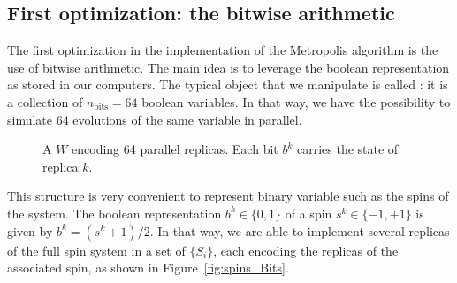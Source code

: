 \subsection{First optimization: the bitwise arithmetic}
The first optimization in the implementation of the Metropolis algorithm is the use of bitwise arithmetic. The main idea is to leverage the boolean representation as stored in our computers. The typical object that we manipulate is called \Bits: it is a collection of $n_\text{bits}=64$ boolean variables. In that way, we have the possibility to simulate $64$ evolutions of the same variable in parallel.
\begin{figure}[ht]
\centering
{}
\caption{A \Bits $W$ encoding 64 parallel replicas. Each bit $b^k$ carries the state of replica $k$.}
\label{fig:Bits}
\end{figure}

This structure is very convenient to represent binary variable such as the spins of the system. The boolean representation $b^k \in \{0,1\}$ of a spin $s^k \in \{-1,+1\}$ is given by $b^k = (s^k+1)/2$. In that way, we are able to implement several replicas of the full spin system in a set of \Bits $\{S_i\}$, each encoding the replicas of the associated spin, as shown in Figure~\ref{fig:spins_Bits}.

